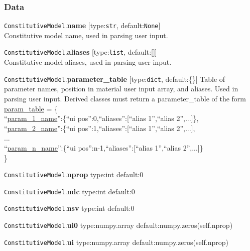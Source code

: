 \documentclass[11pt]{article}
\newcommand{\str}{\texttt{str}}
\newcommand{\none}{\texttt{None}}
\newcommand{\lst}{\texttt{list}}
\newcommand{\dict}{\texttt{dict}}
\begin{document}
\subsubsection{Data}

\begin{description}
  \item{\texttt{ConstitutiveModel}.\textbf{name}} [type:\str, default:\none]\\
  Constitutive model name, used in parsing user input.

  \item{\texttt{ConstitutiveModel}.\textbf{aliases}} [type:\lst, default:[]]\\
  Constitutive model aliases, used in parsing user input.

  \item{\texttt{ConstitutiveModel}.\textbf{parameter\_table}}
  [type:\dict, default:\{\}] \newline
  Table of parameter names, position in material user input array, and aliases.
  Used in parsing user input. Derived classes must return a parameter\_table of the form\\
  \url{param_table} = \{\\
  ``\url{param_1_name}'':\{``ui pos'':0,``aliases'':[``alias 1'',``alias 2'',...]\},\\
  ``\url{param_2_name}'':\{``ui pos'':1,``aliases'':[``alias 1'',``alias 2'',...],\\
  ... \\
  ``\url{param_n_name}'':\{``ui pos'':n-1,``aliases'':[``alias 1'',``alias 2'',...]\}\\
  \}
  \item{\texttt{ConstitutiveModel}.\textbf{nprop}} \newline
  type:int
  default:0

  \item{\texttt{ConstitutiveModel}.\textbf{ndc}} \newline
  type:int
  default:0

  \item{\texttt{ConstitutiveModel}.\textbf{nsv}} \newline
  type:int
  default:0

  \item{\texttt{ConstitutiveModel}.\textbf{ui0}} \newline
  type:numpy.array\newline
  default:numpy.zeros(self.nprop)

  \item{\texttt{ConstitutiveModel}.\textbf{ui}} \newline
  type:numpy.array\newline
  default:numpy.zeros(self.nprop)


\end{description}
\end{document}
